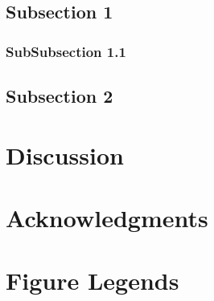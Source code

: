\subsection*{Subsection 1}

\subsubsection*{SubSubsection 1.1}

\subsection*{Subsection 2}

\section*{Discussion}




\section*{Acknowledgments}





%
%
% 

\section*{Figure Legends}
%

